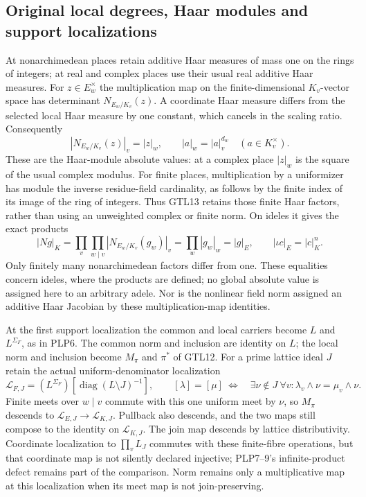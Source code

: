 \subsection{Original local degrees, Haar modules and support localizations}

At nonarchimedean places retain additive Haar measures of mass
one on the rings of integers; at real and complex places use
their usual real additive Haar measures. For $z\in E_w^\times$
the multiplication map on the finite-dimensional $K_v$-vector
space has determinant $N_{E_w/K_v}(z)$. A coordinate Haar
measure differs from the selected local Haar measure by one
constant, which cancels in the scaling ratio. Consequently
\begin{equation}\tag{GTL13}
 |N_{E_w/K_v}(z)|_v=|z|_w,
 \qquad |a|_w=|a|_v^{d_w}\quad(a\in K_v^\times).
\end{equation}
These are the Haar-module absolute values: at a complex place
$|z|_w$ is the square of the usual complex modulus. For finite
places, multiplication by a uniformizer has module the inverse
residue-field cardinality, as follows by the finite index of its
image of the ring of integers. Thus GTL13 retains those finite
Haar factors, rather than using an unweighted complex or finite norm.
On ideles it gives the exact products
\begin{equation}\tag{GTL14}
 |N g|_K=\prod_v\prod_{w\mid v}|N_{E_w/K_v}(g_w)|_v
       =\prod_w|g_w|_w=|g|_E,
 \qquad |\iota c|_E=|c|_K^n.
\end{equation}
Only finitely many nonarchimedean factors differ from one.
These equalities concern ideles, where the products are defined;
no global absolute value is assigned here to an arbitrary adele.
Nor is the nonlinear field norm assigned an additive Haar
Jacobian by these multiplication-map identities.

At the first support localization the common and local carriers
become $L$ and $L^{\Sigma_F}$, as in PLP6. The common norm and
inclusion are identity on $L$; the local norm and inclusion become
$M_\pi$ and $\pi^*$ of GTL12. For a prime lattice ideal $J$ retain
the actual uniform-denominator localization
\begin{equation}\tag{GTL15}
 \mathscr L_{F,J}=(L^{\Sigma_F})
             [\operatorname{diag}(L\setminus J)^{-1}],\qquad
 [\lambda]=[\mu]\ \Longleftrightarrow\quad
 \exists\nu\notin J\ \forall v:\lambda_v\wedge\nu=\mu_v\wedge\nu.
\end{equation}
Finite meets over $w\mid v$ commute with this one uniform meet
by $\nu$, so $M_\pi$ descends to
$\mathscr L_{E,J}\to\mathscr L_{K,J}$. Pullback also descends,
and the two maps still compose to the identity on
$\mathscr L_{K,J}$. The join map descends by lattice
distributivity. Coordinate localization to $\prod_v L_J$
commutes with these finite-fibre operations, but that coordinate
map is not silently declared injective; PLP7--9's infinite-product
defect remains part of the comparison. Norm remains only a
multiplicative map at this localization when its meet map is
not join-preserving.

